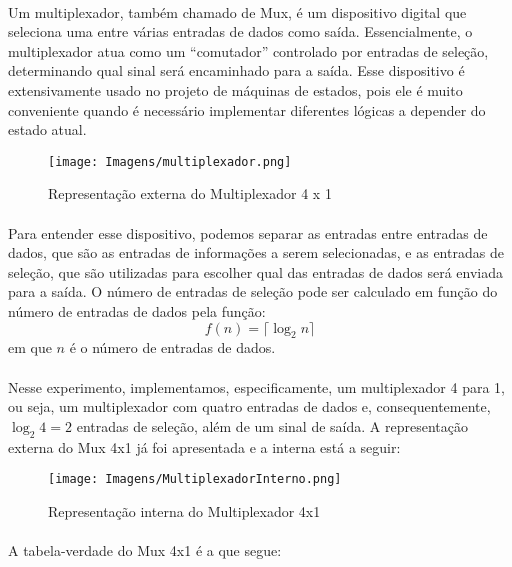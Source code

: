 \documentclass[a4paper,12pt]{article}
\begin{document}
\paragraph{}
Um multiplexador, também chamado de Mux, é um dispositivo digital que seleciona uma entre várias entradas de dados como saída. Essencialmente, o multiplexador atua como um ``comutador'' controlado por entradas de seleção, determinando qual sinal será encaminhado para a saída. Esse dispositivo é extensivamente usado no projeto de máquinas de estados, pois ele é muito conveniente quando é necessário implementar diferentes lógicas a depender do estado atual.

\begin{figure}[H]
    \centering
    \texttt{[image: Imagens/multiplexador.png]}
    \caption{Representação externa do Multiplexador 4 x 1}
    \label{fig:Mux_externa}
\end{figure}

\paragraph{}
Para entender esse dispositivo, podemos separar as entradas entre entradas de dados, que são as entradas de informações a serem selecionadas, e as entradas de seleção, que são utilizadas para escolher qual das entradas de dados será enviada para a saída. O número de entradas de seleção pode ser calculado em função do número de entradas de dados pela função: 
\[
f(n) = \lceil \log_2n \rceil
\]
em que $n$ é o número de entradas de dados.

\paragraph{}
Nesse experimento, implementamos, especificamente, um multiplexador 4 para 1, ou seja, um multiplexador com quatro entradas de dados e, consequentemente, $\log_2 4 = 2$ entradas de seleção, além de um sinal de saída. A representação externa do Mux 4x1 já foi apresentada e a interna está a seguir:

\begin{figure}[H]
    \centering
    \texttt{[image: Imagens/MultiplexadorInterno.png]}
    \caption{Representação interna do Multiplexador 4x1}
    \label{fig:Mux_interna}
\end{figure}

\paragraph{}
 A tabela-verdade do Mux 4x1 é a que segue:
\end{document}
